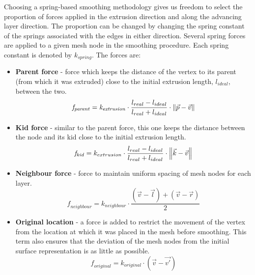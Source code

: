 Choosing a spring-based smoothing methodology gives us freedom to select the proportion of forces applied in the extrusion direction and along the advancing layer direction. The proportion can be changed by changing the spring constant of the springs associated with the edges in either direction. Several spring forces are applied to a given mesh node in the smoothing procedure. Each spring constant is denoted by $k_{spring}$. The forces are:


\begin{itemize}
\item \textbf{Parent force} - force which keeps the distance of the vertex to its parent (from which it was extruded) close to the initial extrusion length, $\mathit{l_{ideal}}$, between the two.
\begin{equation}
\mathit{f_{parent}} = \mathit{k_{extrusion}} \cdot \frac{l_{real} - l_{ideal}}{l_{real} + l_{ideal}} \cdot \left\lVert \vec{p} - \vec{v}\right\rVert
\end{equation}
\item \textbf{Kid force} - similar to the parent force, this one keeps the distance between the node and its kid close to the initial extrusion length.
\begin{equation}
\mathit{f_{kid}} = k_{extrusion} \cdot \frac{l_{real} - l_{ideal}}{l_{real} + l_{ideal}} \cdot \left\lVert\vec{k} - \vec{v}\right\rVert
\end{equation}
\item \textbf{Neighbour force} - force to maintain uniform spacing of mesh nodes for each layer.
\begin{equation}
\mathit{f_{neighbour}} = k_{neighbour} \cdot \frac{(\vec{v} - \vec{l}) + (\vec{v}- \vec{r})}{ 2}
\end{equation}
\item \textbf{Original location} - a force is added to restrict the movement of the vertex from the location at which it was placed in the mesh before smoothing. This term also ensures that the deviation of the mesh nodes from the initial surface representation is as little as possible.
\begin{equation}
\mathit{f_{original}} = k_{original} \cdot (\vec{v}- \vec{v'})
\end{equation}
\end{itemize}

